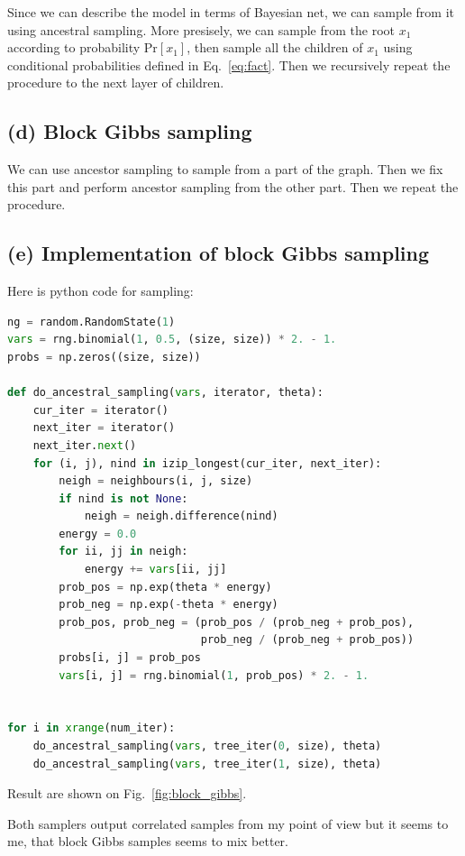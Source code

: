\documentclass[a4paper]{article}
\begin{document}
Since we can describe the model in terms of Bayesian net, we can sample from it using 
ancestral sampling. More presisely, we can sample from the root $x_1$ according to probability
$\mathrm{Pr}[x_1]$, then sample all the children of $x_1$ using conditional probabilities defined 
in Eq.~\ref{eq:fact}. Then we recursively repeat the procedure to the next layer of children.

\subsection{(d) Block Gibbs sampling}

We can use ancestor sampling to sample from a part of the graph. Then we fix this part and perform 
ancestor sampling from the other part. Then we repeat the procedure.

\subsection{(e) Implementation of block Gibbs sampling}

Here is python code for sampling:
\begin{lstlisting}[language=Python]
ng = random.RandomState(1)
vars = rng.binomial(1, 0.5, (size, size)) * 2. - 1.
probs = np.zeros((size, size))

def do_ancestral_sampling(vars, iterator, theta):
    cur_iter = iterator()
    next_iter = iterator()
    next_iter.next()
    for (i, j), nind in izip_longest(cur_iter, next_iter):
        neigh = neighbours(i, j, size)
        if nind is not None:
            neigh = neigh.difference(nind)
        energy = 0.0
        for ii, jj in neigh:
            energy += vars[ii, jj]
        prob_pos = np.exp(theta * energy)
        prob_neg = np.exp(-theta * energy)
        prob_pos, prob_neg = (prob_pos / (prob_neg + prob_pos),
                              prob_neg / (prob_neg + prob_pos))
        probs[i, j] = prob_pos
        vars[i, j] = rng.binomial(1, prob_pos) * 2. - 1.
        
        
for i in xrange(num_iter):
    do_ancestral_sampling(vars, tree_iter(0, size), theta)
    do_ancestral_sampling(vars, tree_iter(1, size), theta)
\end{lstlisting}

Result are shown on Fig.~\ref{fig:block_gibbs}.

Both samplers output correlated samples from my point of view but it seems to me, that 
block Gibbs samples seems to mix better.
\end{document}
